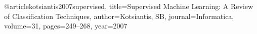 @article{kotsiantis2007supervised,
  title={Supervised Machine Learning: A Review of Classification Techniques},
  author={Kotsiantis, SB},
  journal={Informatica},
  volume={31},
  pages={249--268},
  year={2007}
}